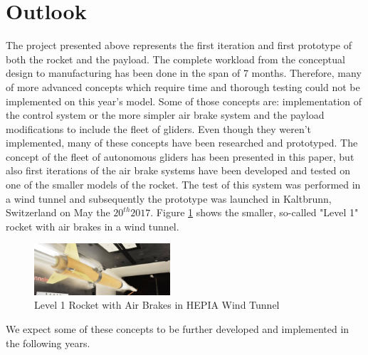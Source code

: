 \documentclass[]{iac}
\begin{document}
\section{Outlook}
The project presented above represents the first iteration and first prototype of both the rocket and the payload. The complete workload from the conceptual design to manufacturing has been done in the span of 7 months. Therefore, many of more advanced concepts which require time and thorough testing could not be implemented on this year's model. Some of those concepts are: implementation of the control system or the more simpler air brake system and the payload modifications to include the fleet of gliders. Even though they weren't implemented, many of these concepts have been researched and prototyped. The concept of the fleet of autonomous gliders has been presented in this paper, but also first iterations of the air brake systems have been developed and tested on one of the smaller models of the rocket. The test of this system was performed in a wind tunnel and subsequently the prototype was launched in Kaltbrunn, Switzerland on May the $20^{th} 2017$. Figure \ref{f:level1_airbrake} shows the smaller, so-called "Level 1" rocket with air brakes in a wind tunnel. 

  \begin{figure}[h!]
 	\centering
        \includegraphics[width=0.45\textwidth]{img/level1.png}
        \caption{Level 1 Rocket with Air Brakes in HEPIA Wind Tunnel}
        \label{f:level1_airbrake}
 \end{figure}

We expect some of these concepts to be further developed and implemented in the following years.






\end{document}
